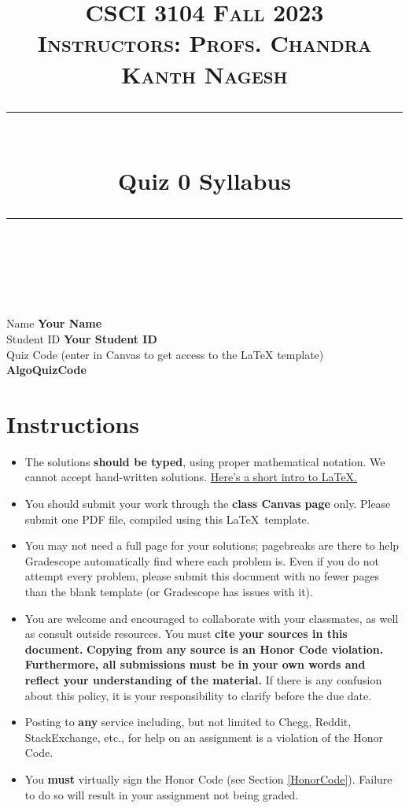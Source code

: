 \documentclass[11pt]{article}
\title{
\normalfont \normalsize 
\textsc{CSCI 3104 Fall 2023 \\ 
Instructors: Profs. Chandra Kanth Nagesh} \\
[10pt] 
\rule{\linewidth}{0.5pt} \\[6pt] 
\huge Quiz 0 Syllabus\\
\rule{\linewidth}{2pt}  \\[10pt]
}
\date{}
\theoremstyle{definition}
\theoremstyle{definition}
\theoremstyle{definition}
\begin{document}
\maketitle


\noindent
Name \dotfill \textbf{Your Name} \\
Student ID \dotfill \textbf{Your Student ID} \\
Quiz Code (enter in Canvas to get access to the LaTeX template) \dotfill \textbf{AlgoQuizCode}

\tableofcontents

\section{Instructions}
 \begin{itemize}
	\item The solutions \textbf{should be typed}, using proper mathematical notation. We cannot accept hand-written solutions. \href{http://ece.uprm.edu/~caceros/latex/introduction.pdf}{Here's a short intro to \LaTeX.}
	\item You should submit your work through the \textbf{class Canvas page} only. Please submit one PDF file, compiled using this \LaTeX \ template.
	\item You may not need a full page for your solutions; pagebreaks are there to help Gradescope automatically find where each problem is. Even if you do not attempt every problem, please submit this document with no fewer pages than the blank template (or Gradescope has issues with it).

	\item You are welcome and encouraged to collaborate with your classmates, as well as consult outside resources. You must \textbf{cite your sources in this document.} \textbf{Copying from any source is an Honor Code violation. Furthermore, all submissions must be in your own words and reflect your understanding of the material.} If there is any confusion about this policy, it is your responsibility to clarify before the due date. 

	\item Posting to \textbf{any} service including, but not limited to Chegg, Reddit, StackExchange, etc., for help on an assignment is a violation of the Honor Code.

	\item You \textbf{must} virtually sign the Honor Code (see Section \ref{HonorCode}). Failure to do so will result in your assignment not being graded.
\end{itemize}
\end{document}
